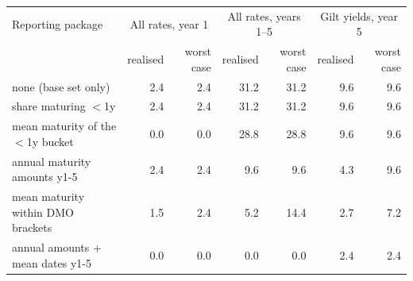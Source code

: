 \begin{tabular}{lrrrrrr}
\toprule
Reporting package & \multicolumn{2}{c}{All rates, year 1} & \multicolumn{2}{c}{All rates, years 1--5} & \multicolumn{2}{c}{Gilt yields, year 5} \\
 & realised & worst case & realised & worst case & realised & worst case \\
\midrule
none (base set only) & 2.4 & 2.4 & 31.2 & 31.2 & 9.6 & 9.6 \\
share maturing $<$1y & 2.4 & 2.4 & 31.2 & 31.2 & 9.6 & 9.6 \\
mean maturity of the $<$1y bucket & 0.0 & 0.0 & 28.8 & 28.8 & 9.6 & 9.6 \\
annual maturity amounts y1-5 & 2.4 & 2.4 & 9.6 & 9.6 & 4.3 & 9.6 \\
mean maturity within DMO brackets & 1.5 & 2.4 & 5.2 & 14.4 & 2.7 & 7.2 \\
annual amounts + mean dates y1-5 & 0.0 & 0.0 & 0.0 & 0.0 & 2.4 & 2.4 \\
\bottomrule
\end{tabular}
